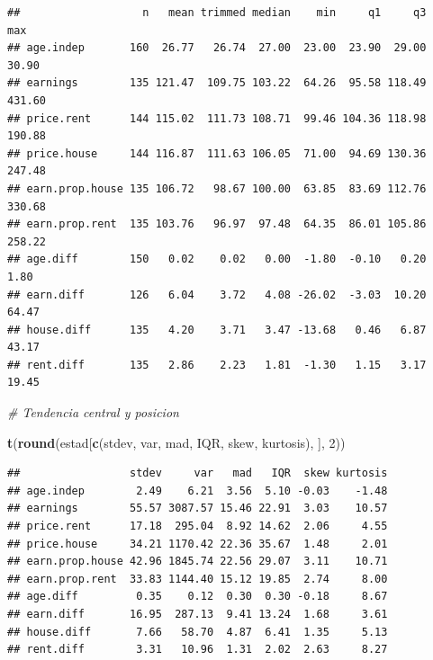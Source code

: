 \documentclass[water,article,submit,pdftex,moreauthors]{Definitions/mdpi}
\newenvironment{Shaded}{\begin{snugshade}}{\end{snugshade}}
\newcommand{\CommentTok}[1]{\textcolor[rgb]{0.56,0.35,0.01}{\textit{#1}}}
\newcommand{\DecValTok}[1]{\textcolor[rgb]{0.00,0.00,0.81}{#1}}
\newcommand{\FunctionTok}[1]{\textcolor[rgb]{0.13,0.29,0.53}{\textbf{#1}}}
\newcommand{\NormalTok}[1]{#1}
\newcommand{\StringTok}[1]{\textcolor[rgb]{0.31,0.60,0.02}{#1}}
\begin{document}
\begin{verbatim}
##                   n   mean trimmed median    min     q1     q3    max
## age.indep       160  26.77   26.74  27.00  23.00  23.90  29.00  30.90
## earnings        135 121.47  109.75 103.22  64.26  95.58 118.49 431.60
## price.rent      144 115.02  111.73 108.71  99.46 104.36 118.98 190.88
## price.house     144 116.87  111.63 106.05  71.00  94.69 130.36 247.48
## earn.prop.house 135 106.72   98.67 100.00  63.85  83.69 112.76 330.68
## earn.prop.rent  135 103.76   96.97  97.48  64.35  86.01 105.86 258.22
## age.diff        150   0.02    0.02   0.00  -1.80  -0.10   0.20   1.80
## earn.diff       126   6.04    3.72   4.08 -26.02  -3.03  10.20  64.47
## house.diff      135   4.20    3.71   3.47 -13.68   0.46   6.87  43.17
## rent.diff       135   2.86    2.23   1.81  -1.30   1.15   3.17  19.45
\end{verbatim}

\begin{Shaded}
\begin{Highlighting}[]
\CommentTok{\# Tendencia central y posicion}

\FunctionTok{t}\NormalTok{(}\FunctionTok{round}\NormalTok{(estad[}\FunctionTok{c}\NormalTok{(}\StringTok{\textquotesingle{}stdev\textquotesingle{}}\NormalTok{, }\StringTok{\textquotesingle{}var\textquotesingle{}}\NormalTok{, }\StringTok{\textquotesingle{}mad\textquotesingle{}}\NormalTok{, }\StringTok{\textquotesingle{}IQR\textquotesingle{}}\NormalTok{, }\StringTok{\textquotesingle{}skew\textquotesingle{}}\NormalTok{, }\StringTok{\textquotesingle{}kurtosis\textquotesingle{}}\NormalTok{), ], }\DecValTok{2}\NormalTok{))}
\end{Highlighting}
\end{Shaded}

\begin{verbatim}
##                 stdev     var   mad   IQR  skew kurtosis
## age.indep        2.49    6.21  3.56  5.10 -0.03    -1.48
## earnings        55.57 3087.57 15.46 22.91  3.03    10.57
## price.rent      17.18  295.04  8.92 14.62  2.06     4.55
## price.house     34.21 1170.42 22.36 35.67  1.48     2.01
## earn.prop.house 42.96 1845.74 22.56 29.07  3.11    10.71
## earn.prop.rent  33.83 1144.40 15.12 19.85  2.74     8.00
## age.diff         0.35    0.12  0.30  0.30 -0.18     8.67
## earn.diff       16.95  287.13  9.41 13.24  1.68     3.61
## house.diff       7.66   58.70  4.87  6.41  1.35     5.13
## rent.diff        3.31   10.96  1.31  2.02  2.63     8.27
\end{verbatim}
\end{document}
